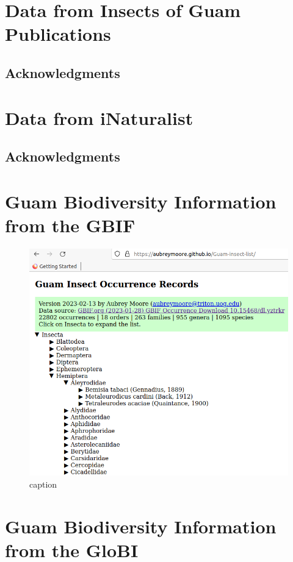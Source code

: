 \documentclass[12pt,letterpaper,english,bibliography=totocnumbered, abstract=on]{scrartcl}
\begin{document}
\pagebreak
\section{Data from Insects of Guam Publications}

\nocite{*}
\printbibliography[heading=none]

\subsection{Acknowledgments}


\pagebreak
\section{Data from iNaturalist}
\subsection{Acknowledgments}


\pagebreak
\section{Guam Biodiversity Information from the GBIF}

\begin{figure}[H]
	\centering
	\includegraphics[width=.7\linewidth]{images/guam-insect-occurrence-records}
	\caption{caption}
	\label{fig:guam-insect-occurrence-records}
\end{figure}

\clearpage



\pagebreak
\section{Guam Biodiversity Information from the GloBI}
\end{document}
